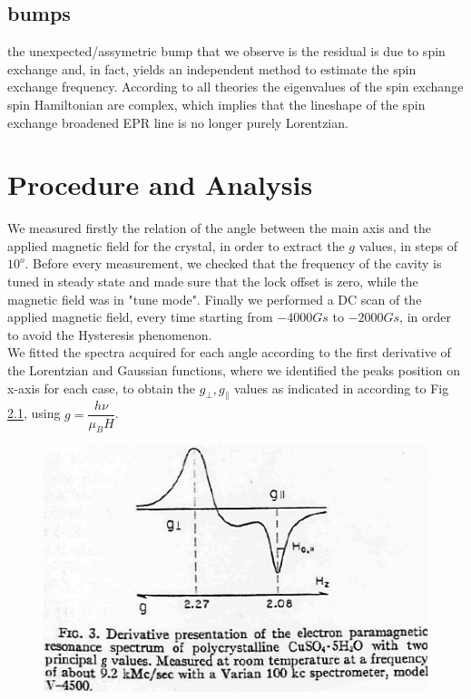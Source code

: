 \documentclass[openany,11pt,a4paper]{report}
\begin{document}
\section{bumps}
the unexpected/assymetric bump that we observe is  the residual is due to spin
exchange and, in fact, yields an independent method to
estimate the spin exchange frequency. According to
all theories the eigenvalues of the spin exchange spin
Hamiltonian are complex, which implies that the lineshape
of the spin exchange broadened EPR line is no
longer purely Lorentzian. \cite{bump}


\chapter{Procedure and Analysis}
We measured firstly the relation of the angle between the main axis and the applied magnetic field for the crystal, in order to extract the $g$ values, in steps of $10 ^{o}$. Before every measurement, we checked that the frequency of the cavity is tuned in steady state and made sure that the lock offset is zero, while the magnetic field was in "tune mode". Finally we performed a DC scan of the applied magnetic field, every time starting from $-4000 Gs$ to $-2000Gs$, in order to avoid the Hysteresis phenomenon.\\


We fitted the spectra acquired for each angle according to the first derivative of the Lorentzian and Gaussian functions, where we identified the peaks position on x-axis for each case, to obtain the $g_{\perp}, g_{\parallel}$ values as indicated in \cite{viscous_liquids} according to Fig \ref{Fig:reference}, using  $g=  \dfrac{h \nu}{\mu_{B} H}$.




\begin{figure}[hbtp]
\caption{\cite{viscous_liquids}}
\centering
\includegraphics[scale=0.9]{analzsis.PNG}
\label{Fig:reference}
\end{figure}
\end{document}
